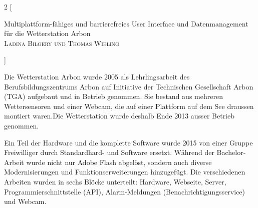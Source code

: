 \documentclass[11pt]{article}
\begin{document}
\begin{multicols}{2}
[
    \begin{center}
      {\huge\sffamily Multiplattform-fähiges und barrierefreies User Interface und Datenmanagement für die Wetterstation Arbon}\\
       \vspace{2ex}
       \textsc{Ladina Bilgery und Thomas Wieling}
    \end{center}
]


Die Wetterstation Arbon wurde 2005 als Lehrlingsarbeit des Berufsbildungszentrums Arbon auf Initiative der Technischen Gesellschaft Arbon (TGA) aufgebaut und in Betrieb genommen. Sie bestand aus mehreren Wettersensoren und einer Webcam, die auf einer Plattform auf dem See draussen montiert waren.Die Wetterstation wurde deshalb Ende 2013 ausser Betrieb genommen.

Ein Teil der Hardware und die komplette Software wurde 2015 von einer Gruppe Freiwilliger durch Standardhard- und Software ersetzt.
Während der Bachelor-Arbeit wurde nicht nur Adobe Flash abgelöst, sondern auch diverse Modernisierungen und Funktionserweiterungen hinzugefügt.
Die verschiedenen Arbeiten wurden in sechs Blöcke unterteilt: Hardware, Webseite, Server, Programmierschnittstelle (API), Alarm-Meldungen (Benachrichtigungsservice) und Webcam.


\end{multicols}
\end{document}
